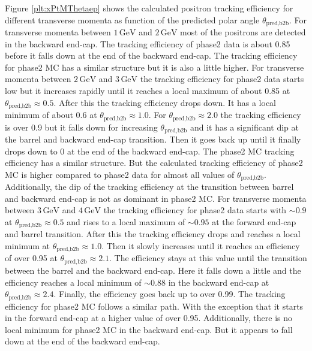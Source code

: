 \documentclass[a4paper,11pt,twosided,final,german,openbib,pdftex,listof=totoc,bibliography=totoc]{scrbook}
\begin{document}
Figure \ref{plt:xPtMThetaep} shows the calculated positron tracking efficiency for different transverse momenta as function of the predicted polar angle $\theta_{\textrm{pred,b2b}}$. For transverse momenta between $1\,\textrm{GeV}$ and $2\,\textrm{GeV}$ most of the positrons are detected in the backward end-cap. The tracking efficiency of phase2 data is about 0.85 before it falls down at the end of the backward end-cap. The tracking efficiency for phase2 MC has a similar structure but it is also a little higher.
For transverse momenta between $2\,\textrm{GeV}$ and $3\,\textrm{GeV}$ the tracking efficiency for phase2 data starts low  but it increases rapidly until it reaches a local maximum of about 0.85 at $\theta_{\textrm{pred,b2b}} \approx 0.5$. After this the tracking efficiency drops down. It has a local minimum of about 0.6 at $\theta_{\textrm{pred,b2b}} \approx 1.0$. For $\theta_{\textrm{pred,b2b}} \approx 2.0$ the tracking efficiency is over 0.9 but it falls down for increasing $\theta_{\textrm{pred,b2b}}$ and it has a significant dip at the barrel and backward end-cap transition. Then it goes back up until it finally drops down to 0 at the end of the backward end-cap. The phase2 MC tracking efficiency has a similar structure. But the calculated tracking efficiency of phase2 MC is higher compared to phase2 data for almost all values of $\theta_{\textrm{pred,b2b}}$. Additionally, the dip of the tracking efficiency at the transition between barrel and backward end-cap is not as dominant in phase2 MC.
For transverse momenta between $3\,\textrm{GeV}$ and $4\,\textrm{GeV}$ the tracking efficiency for phase2 data starts with $\sim 0.9$ at $\theta_{\textrm{pred,b2b}} \approx 0.5$ and rises to a local maximum of $\sim 0.95$ at the forward end-cap and barrel transition. After this the tracking efficiency drops and reaches a local minimum at $\theta_{\textrm{pred,b2b}} \approx 1.0$. Then it slowly increases until it reaches an efficiency of over 0.95 at $\theta_{\textrm{pred,b2b}} \approx 2.1$. The efficiency stays at this value until the transition between the barrel and the backward end-cap. Here it falls down a little and the efficiency reaches a local minimum of $\sim 0.88$ in the backward end-cap at $\theta_{\textrm{pred,b2b}} \approx 2.4$. Finally, the efficiency goes back up to over 0.99. The tracking efficiency for phase2 MC follows a similar path. With the exception that it starts in the forward end-cap at a higher value of over 0.95. Additionally, there is no local minimum for phase2 MC in the backward end-cap. But it appears to fall down at the end of the backward end-cap.
\end{document}
